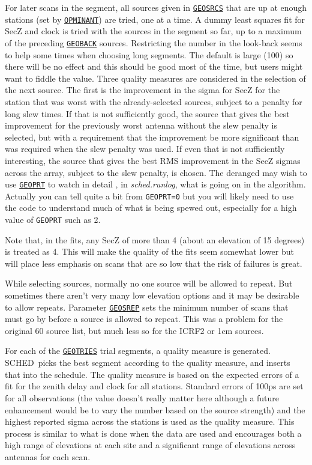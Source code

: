 \documentclass{report}
\newcommand{\schedb}{{\sc SCHED~}}
\begin{document}
For later scans in the segment, all sources given in 
{\hyperref[MP:GEOSRCS]{{\tt GEOSRCS}}}
that are up at enough stations (set by
{\hyperref[MP:OPMINANT]{{\tt OPMINANT}}}) are tried, one at a time.  A
dummy least squares fit for SecZ and clock is tried with the sources
in the segment so far, up to a maximum of the preceding 
{\hyperref[MP:GEOBACK]{{\tt GEOBACK}}} sources.
Restricting the number in the
look-back seems to help some times when choosing long segments.  The
default is large (100) so there will be no effect and this should be
good most of the time, but users might want to fiddle the value.
Three quality measures are considered in the selection of the next
source.  The first is the improvement in the sigma for SecZ for the
station that was worst with the already-selected sources, subject to a
penalty for long slew times.  If that is not sufficiently good, the
source that gives the best improvement for the previously worst
antenna without the slew penalty is selected, but with a requirement
that the improvement be more significant than was required when the
slew penalty was used.  If even that is not sufficiently interesting,
the source that gives the best RMS improvement in the SecZ sigmas
across the array, subject to the slew penalty, is chosen.  The
deranged may wish to use 
{\hyperref[MP:GEOPRT]{{\tt GEOPRT}}} to watch in
detail , in {\sl sched.runlog}, what is going on in the algorithm.  
Actually you can tell quite
a bit from {\tt GEOPRT=0} but you will likely need to use the code to
understand much of what is being spewed out, especially for a high
value of {\tt GEOPRT} such as 2.

Note that, in the fits, any SecZ of more than 4 (about an elevation of
15 degrees) is treated as 4.  This will make the quality of the fits
seem somewhat lower but will place less emphasis on scans that are so
low that the risk of failures is great.

While selecting sources, normally no one source will be allowed to
repeat.  But sometimes there aren't very many low elevation options
and it may be desirable to allow repeats.  Parameter 
{\hyperref[MP:GEOSREP]{{\tt GEOSREP}}}
sets the minimum number of scans that must go by
before a source is allowed to repeat.  This was a problem for the
original 60 source list, but much less so for the ICRF2 or 1cm sources.

For each of the 
{\hyperref[MP:GEOTRIES]{{\tt GEOTRIES}}} trial segments,
a quality measure is generated.  \schedb picks the best segment
according to the quality measure, and inserts that into the schedule.
The quality measure is based on the expected errors of a fit for the
zenith delay and clock for all stations.  Standard errors of 100ps are
set for all observations (the value doesn't really matter here
although a future enhancement would be to vary the number based on the
source strength) and the highest reported sigma across the stations is
used as the quality measure.  This process is similar to what is done
when the data are used and encourages both a high range of elevations
at each site and a significant range of elevations across antennas for
each scan.
\end{document}
